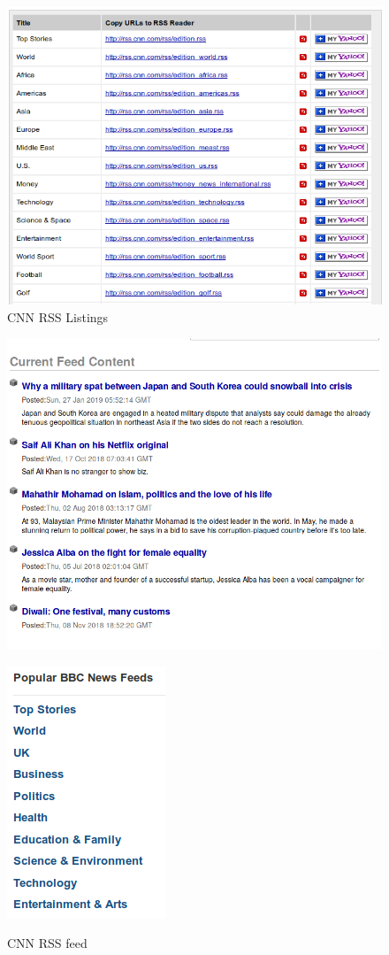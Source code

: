 \documentclass{srmreport}
\begin{document}
\begin{figure}[h]
\center
\begin{multicols}{2}
\includegraphics[scale=0.3]{res/rssfeeds/cnnlistings}\\
\caption{CNN RSS Listings}\vspace{0.5em}
\includegraphics[scale=0.3]{res/rssfeeds/cnnrss}\\
\caption{CNN RSS feed}
\end{multicols}
\begin{multicols}{2}
\includegraphics[scale=0.6]{res/rssfeeds/bbclistings}\\

\end{multicols}
\end{figure}
\end{document}
